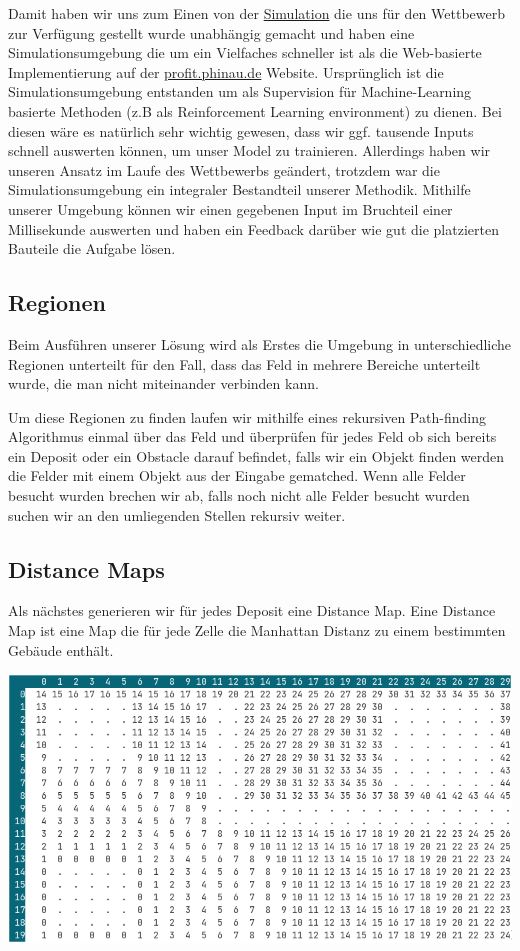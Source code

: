 \documentclass[12pt,a4paper]{article}
\begin{document}
Damit haben wir uns zum Einen von der \href{profit.phinau.de}{Simulation} die uns für den Wettbewerb zur Verfügung gestellt wurde unabhängig gemacht und haben eine Simulationsumgebung die um ein Vielfaches schneller ist als die Web-basierte Implementierung auf der \href{profit.phinau.de}{profit.phinau.de} Website. Ursprünglich ist die Simulationsumgebung entstanden um als Supervision für Machine-Learning basierte Methoden (z.B als Reinforcement Learning environment) zu dienen. Bei diesen wäre es natürlich sehr wichtig gewesen, dass wir ggf. tausende Inputs schnell auswerten können, um unser Model zu trainieren. Allerdings haben wir unseren Ansatz im Laufe des Wettbewerbs geändert, trotzdem war die Simulationsumgebung ein integraler Bestandteil unserer Methodik. Mithilfe unserer Umgebung können wir einen gegebenen Input im Bruchteil einer Millisekunde auswerten und haben ein Feedback darüber wie gut die platzierten Bauteile die Aufgabe lösen.


\subsection{Regionen}
Beim Ausführen unserer Lösung wird als Erstes die Umgebung in unterschiedliche Regionen unterteilt für den Fall, dass das Feld in mehrere Bereiche unterteilt wurde, die man nicht miteinander verbinden kann. 

Um diese Regionen zu finden laufen wir mithilfe eines rekursiven Path-finding Algorithmus einmal über das Feld und überprüfen für jedes Feld ob sich bereits ein Deposit oder ein Obstacle darauf befindet, falls wir ein Objekt finden werden die Felder mit einem Objekt aus der Eingabe gematched. Wenn alle Felder besucht wurden brechen wir ab, falls noch nicht alle Felder besucht wurden suchen wir an den umliegenden Stellen rekursiv weiter.


\newpage

\subsection{Distance Maps}
Als nächstes generieren wir für jedes Deposit eine Distance Map.
Eine Distance Map ist eine Map die für jede Zelle die Manhattan Distanz zu einem bestimmten Gebäude enthält.

\includegraphics[width=\textwidth]{distance_map.png}
\end{document}
